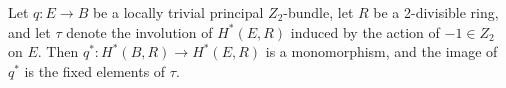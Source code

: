 Let $q: E \rightarrow B$ be a locally trivial principal $Z_2$-bundle, let $R$ be a 2-divisible ring, and let $\tau$ denote the involution of $H^*(E, R)$ induced by the action of $-1 \in Z_2$ on $E$. Then $q^*: H^*(B, R) \rightarrow H^*(E, R)$ is a monomorphism, and the image of $q^*$ is the fixed elements of $\tau$.
